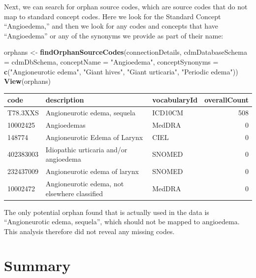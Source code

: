 \documentclass[11pt]{book}
\newenvironment{Shaded}{\begin{snugshade}}{\end{snugshade}}
\newcommand{\KeywordTok}[1]{\textcolor[rgb]{0.13,0.29,0.53}{\textbf{#1}}}
\newcommand{\DataTypeTok}[1]{\textcolor[rgb]{0.13,0.29,0.53}{#1}}
\newcommand{\StringTok}[1]{\textcolor[rgb]{0.31,0.60,0.02}{#1}}
\newcommand{\NormalTok}[1]{#1}
\theoremstyle{definition}
\theoremstyle{definition}
\theoremstyle{definition}
\theoremstyle{remark}
\begin{document}
Next, we can search for orphan source codes, which are source codes that
do not map to standard concept codes. Here we look for the Standard
Concept ``Angioedema,'' and then we look for any codes and concepts that
have ``Angioedema'' or any of the synonyms we provide as part of their
name:

\begin{Shaded}
\begin{Highlighting}[]
\NormalTok{orphans <-}\StringTok{ }\KeywordTok{findOrphanSourceCodes}\NormalTok{(connectionDetails,}
                                 \DataTypeTok{cdmDatabaseSchema =}\NormalTok{ cdmDbSchema,}
                                 \DataTypeTok{conceptName =} \StringTok{"Angioedema"}\NormalTok{,}
                                 \DataTypeTok{conceptSynonyms =} \KeywordTok{c}\NormalTok{(}\StringTok{"Angioneurotic edema"}\NormalTok{,}
                                                     \StringTok{"Giant hives"}\NormalTok{,}
                                                     \StringTok{"Giant urticaria"}\NormalTok{,}
                                                     \StringTok{"Periodic edema"}\NormalTok{))}
\KeywordTok{View}\NormalTok{(orphans)}
\end{Highlighting}
\end{Shaded}

\begin{longtable}[]{@{}lllr@{}}
\toprule
code & description & vocabularyId & overallCount\tabularnewline
\midrule
\endhead
T78.3XXS & Angioneurotic edema, sequela & ICD10CM & 508\tabularnewline
10002425 & Angioedemas & MedDRA & 0\tabularnewline
148774 & Angioneurotic Edema of Larynx & CIEL & 0\tabularnewline
402383003 & Idiopathic urticaria and/or angioedema & SNOMED &
0\tabularnewline
232437009 & Angioneurotic edema of larynx & SNOMED & 0\tabularnewline
10002472 & Angioneurotic edema, not elsewhere classified & MedDRA &
0\tabularnewline
\bottomrule
\end{longtable}

The only potential orphan found that is actually used in the data is
``Angioneurotic edema, sequela'', which should not be mapped to
angioedema. This analysis therefore did not reveal any missing codes.

\section{Summary}\label{summary-10}
\end{document}
